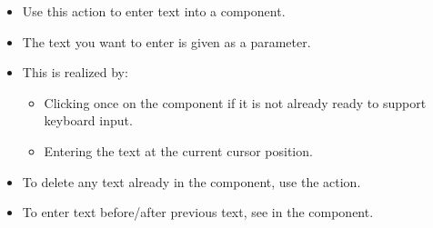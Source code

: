 \begin{itemize}
\item Use this action to enter text into a component.
\item The text you want to enter is given as a parameter.
\item This is realized by:
\begin{itemize}
\item Clicking once on the component if it is not already ready to support keyboard input.
\item Entering the text at the current cursor position.
\end{itemize}
\item To delete any text already in the component, use the action.
\item To enter text before/after previous text, see  in the  component.
\end{itemize}



